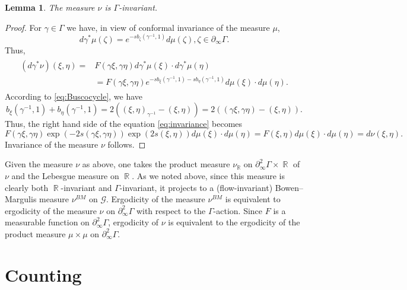 \documentclass[12pt]{amsbook}%
\newtheorem{lem}[thm]{Lemma}
\theoremstyle{definition}
\theoremstyle{remark}
\numberwithin{section}{chapter}
\numberwithin{subsection}{section}
\numberwithin{figure}{chapter}
\DeclareMathOperator{\R}{\mathbb{R}}
\def\Ga{\Gamma}
\def\ga{\gamma}
\def\geo{\partial_\infty}
\def\cG{{\mathscr{G}}}
\begin{document}
{{ 
 \begin{lem}
 The measure $\nu$ is $\Ga$-invariant. 
 \end{lem}
 \begin{proof} For $\ga\in \Ga$ we have, in view of conformal invariance of the measure $\mu$,
$$
d\ga^*\mu(\zeta)= e^{-sb_\zeta(\ga^{-1},1)} d\mu(\zeta), \zeta\in \geo \Ga. 
$$
Thus,
\begin{align}\label{eq:invariance}
\begin{split}
(d\ga^*\nu)(\xi,\eta)= &F(\ga\xi,\ga\eta)d\ga^*\mu(\xi)\cdot d\ga^*\mu(\eta) \\
& =F(\ga \xi, \ga \eta) e^{-sb_{\xi}(\ga^{-1},1)- sb_{\eta}(\ga^{-1},1)} d\mu(\xi)\cdot d\mu(\eta). 
\end{split}
\end{align}
According to \eqref{eq:Buscocycle}, we have
$$
b_{\xi}(\ga^{-1},1)+ b_\eta(\ga^{-1},1)= 2 ((\xi,\eta)_{\ga^{-1}} - (\xi,\eta))= 2 ((\ga\xi,\ga\eta) - (\xi,\eta)). 
$$
Thus, the right hand side of the equation \eqref{eq:invariance} becomes
$$
F(\ga \xi, \ga \eta) \exp(-2s (\ga\xi,\ga\eta) ) \exp(2s(\xi,\eta))d\mu(\xi)\cdot d\mu(\eta)= F(\xi,\eta)d\mu(\xi)\cdot d\mu(\eta)= d\nu(\xi,\eta). 
$$
Invariance of the measure $\nu$ follows. \end{proof}

\medskip
Given the measure $\nu$ as above, one takes the product measure $\nu_{\R}$ on $\geo^2\Ga \times \R$ of $\nu$ and the Lebesgue measure on $\R$. 
As we noted above, since this measure is clearly both $\R$-invariant and $\Ga$-invariant, it projects to a (flow-invariant) Bowen--Margulis measure 
$\nu^{BM}$ on $\cG$. Ergodicity of the measure $\nu^{BM}$ is equivalent to ergodicity of the measure $\nu$ on $\geo^2\Ga$ with respect to the $\Ga$-action. 
Since $F$ is a measurable function on  $\geo^2\Ga$, ergodicity of $\nu$ is equivalent to the ergodicity of the product measure $\mu\times \mu$ on $\geo^2\Ga$. 






















\section{Counting}


}}
\end{document}
